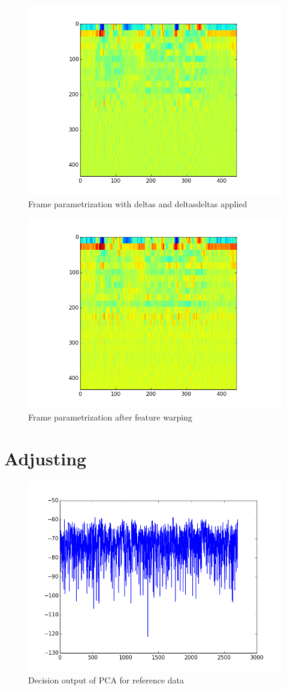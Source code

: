 \documentclass[magister]{dyplom}
\begin{document}
	\begin{figure}[th!]
		\centering
		\includegraphics[width=0.5\linewidth]{images/simulation/PAR_011_parametrized_with_delta}
		\caption{Frame parametrization with deltas and deltasdeltas applied}
		\label{fig:PAR_011_parametrized_with_delta}
	\end{figure}

	\begin{figure}[th!]
		\centering
		\includegraphics[width=0.5\linewidth]{images/simulation/PAR_012_feature_warped}
		\caption{Frame parametrization after feature warping}
		\label{fig:PAR_012_feature_warped}
	\end{figure}
		
	\section{Adjusting}
	
	\begin{figure}[th!]
		\centering
		\includegraphics[width=0.5\linewidth]{images/simulation/ADJ_001_PCA_decision_output}
		\caption{Decision output of \gls{PCA} for reference data}
		\label{fig:ADJ_001_PCA_decision_output}
	\end{figure}
\end{document}
